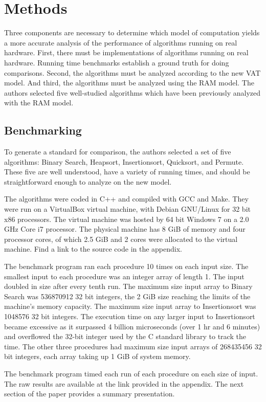 \section{Methods}
  
  Three components are necessary to determine which model of computation yields
  a more accurate analysis of the performance of algorithms running on real
  hardware. First, there must be implementations of algorithms running on real
  hardware. Running time benchmarks establish a ground truth for doing
  comparisons. Second, the algorithms must be analyzed according to the new VAT
  model. And third, the algorithms must be analyzed using the RAM model. The 
  authors selected five well-studied algorithms which have been previously
  analyzed with the RAM model.
  
  \subsection{Benchmarking}
  
  To generate a standard for comparison, the authors selected a set of five
  algorithms: Binary Search, Heapsort, Insertionsort, Quicksort, and Permute. 
  These five are well understood, have a variety of running times, and should
  be straightforward enough to analyze on the new model.
  
  The algorithms were coded in C++ and compiled with GCC and Make. They were
  run on a VirtualBox virtual machine, with Debian GNU/Linux for 32 bit
  x86 processors. The virtual machine was hosted by 64 bit Windows 7 on a 2.0
  GHz Core i7 processor. The physical machine has 8 GiB of memory and four
  processor cores, of which 2.5 GiB and 2 cores were allocated to the virtual
  machine. Find a link to the source code in the appendix.
  
  The benchmark program ran each procedure 10 times on each input size. The 
  smallest input to each procedure was an integer array of length 1. The input
  doubled in size after every tenth run. The maximum size input array to 
  Binary Search was 536870912 32 bit integers, the 2 GiB size reaching the 
  limits of the machine's memory capacity. The maximum size input array to 
  Insertionsort was 1048576 32 bit integers. The execution time on any larger
  input to Insertionsort became excessive as it surpassed 4 billion
  microseconds (over 1 hr and 6 minutes) and overflowed the 32-bit integer
  used by the C standard library to track the time. The other three procedures
  had maximum size input arrays of 268435456 32 bit integers, each array taking
  up 1 GiB of system memory.
  
  The benchmark program timed each run of each procedure on each size of input.
  The raw results are available at the link provided in the appendix. The next
  section of the paper provides a summary presentation.
